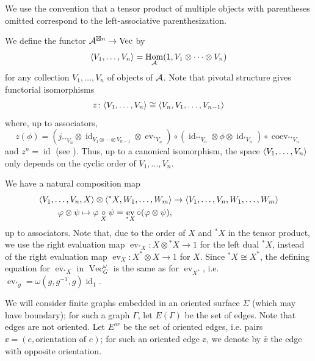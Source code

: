 \documentclass{ws-jktr}
\newcommand{\lstar}{{^*}}
\DeclareMathOperator{\id}{id}
\DeclareMathOperator{\Vect}{Vec}
\DeclareMathOperator{\Hom}{Hom}
\DeclareMathOperator{\coev}{coev}
\DeclareMathOperator{\ev}{ev}
\newcommand{\one}{1}
\newcommand{\Ga}{\Gamma}
\newcommand{\ph}{\varphi}
\newcommand{\Si}{\Sigma}
\begin{document}
We use the convention that a tensor product of multiple objects with parentheses
omitted correspond to the left-associative parenthesization.

We define the functor $\A^{\boxtimes n}\to \Vect$ by
\begin{equation}\label{e:vev}
\<V_1,\dots,V_n\>=\Hom_\A(\one,
V_1\otimes\dots\otimes V_n)
\end{equation}
for any collection $V_1,\dots, V_n$ of objects of $\mathcal{A}$. Note that pivotal
structure gives functorial isomorphisms
\begin{equation}\label{e:cyclic}
z\colon\<V_1,\dots,V_n\>\cong \<V_n, V_1,\dots,V_{n-1}\>
\end{equation}
where, up to associators,
$$z(\phi)= (j_{\lstar \lstar V_n} \otimes \id_{V_1 \otimes \cdots \otimes V_{n-1}} \otimes \ev_{\lstar V_n} ) \circ (\id_{\lstar \lstar V_n} \otimes \phi \otimes \id_{\lstar V_n} ) \circ  \coev_{\lstar \lstar V_n}  $$ 
and $z^n=\id$ (see \cite[Section 5.3]{BK}). Thus, up to a canonical
isomorphism, the space $\langle V_1,\dots,V_n\rangle$ only depends on the cyclic order
of $V_1,\dots, V_n$.

We have a natural composition map 
\begin{equation}\label{e:composition}
\begin{aligned}
 \<V_1,\dots,V_n, X\> \otimes \<\lstar X, W_1,\dots,
W_m\>&\to\<V_1,\dots,V_n, W_1,\dots, W_m\> \\
\ph\otimes\psi\mapsto \ph\cc{X}\psi= \ev_{\lstar X} \circ (\ph\otimes\psi),
\end{aligned}
\end{equation}
up to associators.  Note that, due to the order of $X$ and $\lstar X$ in the tensor product, we use the right evaluation map $\ev_{\lstar X} \colon X \otimes  \lstar X \to \one$ for the left dual $\lstar X$, instead of the right evaluation map $\ev_X : X^* \otimes X \to 1$ for $X$.  Since $\lstar X \cong X^*$, the defining equation for $\ev_{\lstar X}$  in $\Vect_G^\omega$ is the same as for $\ev_{X^*}$, i.e. $\ev_{\lstar g} = \omega(g, g^{-1}, g) \id_{1}$.

We will consider finite  graphs embedded in an oriented surface $\Si$
(which may have boundary); for such a
graph $\Ga$, let $E(\Ga)$ be the set of edges. Note that edges are not
oriented. Let $E^{or}$ be the set of oriented edges, i.e. pairs $\ee=(e,
\text{orientation of } e)$; for such an oriented edge $\ee$, we denote by
$\bar{\ee}$ the edge with opposite orientation.
\end{document}
